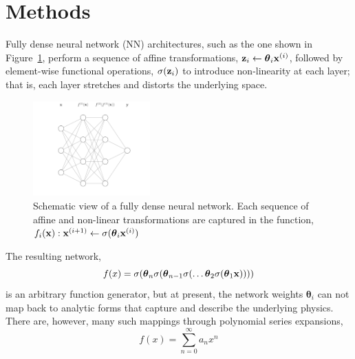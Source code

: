 \section{Methods}\label{methods}

Fully dense neural network (NN) architectures, such as the one shown in Figure~\ref{fig:nn-1}, perform a sequence of affine transformations, ${\bold z}_i \leftarrow \boldsymbol\theta_i {\bold x}^{(i)}$, followed by element-wise functional operations, $\sigma({\bold z}_i)$ to introduce non-linearity at each layer; that is, each layer stretches and distorts the underlying space.
\begin{figure}[htbp]
\begin{center}
\includegraphics[width=0.4\textwidth]{fig/neural-network-01}
\caption{Schematic view of a fully dense neural network. Each sequence of affine and non-linear transformations are captured in the function, $f_i({\bold x}): {\bold x}^{(i+1)} \leftarrow \sigma(\boldsymbol\theta_i {\bold x}^{(i)})$}
\label{fig:nn-1}
\end{center}
\end{figure}

The resulting network,
\begin{equation}
	f(x) = \sigma(\boldsymbol\theta_n \sigma(\boldsymbol\theta_{n-1} \sigma(\ldots \boldsymbol\theta_2 \sigma(\boldsymbol\theta_1{\bold x}))))
	\label{eqn:nn analytical form}
\end{equation}
is an arbitrary function generator, but at present, the network weights $\boldsymbol\theta_i$ can not map back to analytic forms that capture and describe the underlying physics. There are, however, many such mappings through polynomial series expansions,
\begin{equation}
	f(x) = \sum_{n=0}^\infty a_n x^n
\end{equation}

